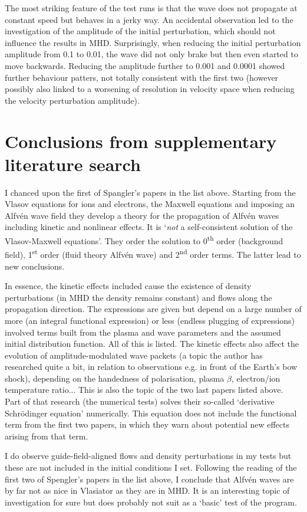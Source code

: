 \documentclass[a4paper,10pt]{scrartcl}
\begin{document}
The most striking feature of the test runs is that the wave does not propagate at constant speed but behaves in a jerky way. An accidental observation led to the investigation of the amplitude of the initial perturbation, which should not influence the results in MHD. Surprisingly, when reducing the initial perturbation amplitude from 0.1 to 0.01, the wave did not only brake but then even started to move backwards. Reducing the amplitude further to 0.001 and 0.0001 showed further behaviour patters, not totally consistent with the first two (however possibly also linked to a worsening of resolution in velocity space when reducing the velocity perturbation amplitude).


\section{Conclusions from supplementary literature search}
I chanced upon the first of Spangler's papers in the list above. Starting from the Vlasov equations for ions and electrons, the Maxwell equations and imposing an Alfvén wave field they develop a theory for the propagation of Alfvén waves including kinetic and nonlinear effects. It is `\textit{not} a self-consistent solution of the Vlasov-Maxwell equations'. They order the solution to 0\textsuperscript{th} order (background field), 1\textsuperscript{st} order (fluid theory Alfvén wave) and 2\textsuperscript{nd} order terms. The latter lead to new conclusions.

In essence, the kinetic effects included cause the existence of density perturbations (in MHD the density remains constant) and flows along the propagation direction. The expressions are given but depend on a large number of more (an integral functional expression) or less (endless plugging of expressions) involved terms built from the plasma and wave parameters and the assumed initial distribution function. All of this is listed. The kinetic effects also affect the evolution of amplitude-modulated wave packets (a topic the author has researched quite a bit, in relation to observations e.g. in front of the Earth's bow shock), depending on the handedness of polarisation, plasma $\beta$, electron/ion temperature ratio... This is also the topic of the two last papers listed above. Part of that research (the numerical tests) solves their so-called `derivative Schrödinger equation' numerically. This equation does not include the functional term from the first two papers, in which they warn about potential new effects arising from that term.

I do observe guide-field-aligned flows and density perturbations in my tests but these are not included in the initial conditions I set. Following the reading of the first two of Spengler's papers in the list above, I conclude that Alfvén waves are by far not as nice in Vlasiator as they are in MHD. It is an interesting topic of investigation for sure but does probably not suit as a `basic' test of the program.
\end{document}
